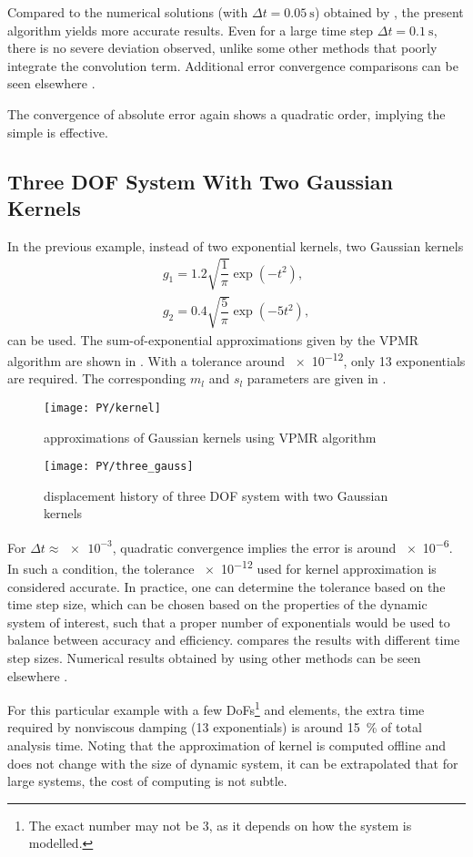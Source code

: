 Compared to the numerical solutions (with $\Delta{}t=\SI{0.05}{\second}$) obtained by \citet{Cortes2009}, the present algorithm yields more accurate results. Even for a large time step $\Delta{}t=\SI{0.1}{\second}$, there is no severe deviation observed, unlike some other methods \citep{Puthanpurayil2014,Liu2014} that poorly integrate the convolution term. Additional error convergence comparisons can be seen elsewhere \citep{Liu2023}.

The convergence of absolute error again shows a quadratic order, implying the simple  is effective.

\subsection{Three DOF System With Two Gaussian Kernels}
In the previous example, instead of two exponential kernels, two Gaussian kernels
\begin{gather}
g_1=1.2\sqrt{\dfrac{1}{\pi}}\exp\left(-t^2\right),\\
g_2=0.4\sqrt{\dfrac{5}{\pi}}\exp\left(-5t^2\right),
\end{gather}
can be used. The sum-of-exponential approximations given by the VPMR algorithm are shown in . With a tolerance around \num{e-12}, only \num{13} exponentials are required. The corresponding $m_l$ and $s_l$ parameters are given in .
\begin{figure}[H]
\centering
\texttt{[image: PY/kernel]}
\caption{approximations of Gaussian kernels using VPMR algorithm}\label{fig:vpmr}
\end{figure}

\begin{figure}[H]
\centering
\texttt{[image: PY/three\_gauss]}
\caption{displacement history of three DOF system with two Gaussian kernels}\label{fig:three_gauss}
\end{figure}
For $\Delta{}t\approx\num{e-3}$, quadratic convergence implies the error is around \num{e-6}. In such a condition, the tolerance \num{e-12} used for kernel approximation is considered accurate. In practice, one can determine the tolerance based on the time step size, which can be chosen based on the properties of the dynamic system of interest, such that a proper number of exponentials would be used to balance between accuracy and efficiency.  compares the results with different time step sizes. Numerical results obtained by using other methods can be seen elsewhere \citep{Shen2021}.

For this particular example with a few DoFs\footnote{The exact number may not be \num{3}, as it depends on how the system is modelled.} and elements, the extra time required by nonviscous damping (\num{13} exponentials) is around \SI{15}{\percent} of total analysis time. Noting that the approximation of kernel is computed offline and does not change with the size of dynamic system, it can be extrapolated that for large systems, the cost of computing  is not subtle.
